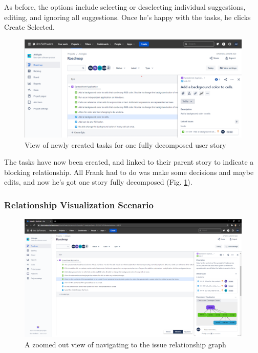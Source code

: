 As before, the options include selecting or deselecting individual suggestions, editing, and ignoring all suggestions. Once he’s happy with the tasks, he clicks Create Selected.

\begin{figure}
\centerline{\includegraphics[width=\textwidth,height=\textheight,keepaspectratio]{./figure/Scenario1Figure5.png}}
\caption{View of newly created tasks for one fully decomposed user story}
\label{fig:Scenario1Figure5}
\end{figure}

The tasks have now been created, and linked to their parent story to indicate a blocking relationship. All Frank had to do was make some decisions and maybe edits, and now he’s got one story fully decomposed (Fig. \ref{fig:Scenario1Figure5}).

\subsubsection{Relationship Visualization Scenario}
\label{Scenario2}

\begin{figure}
\centerline{\includegraphics[width=\textwidth,height=\textheight,keepaspectratio]{./figure/Scenario2Figure1.png}}
\caption{A zoomed out view of navigating to the issue relationship graph}
\label{fig:Scenario2Figure1}
\end{figure}

